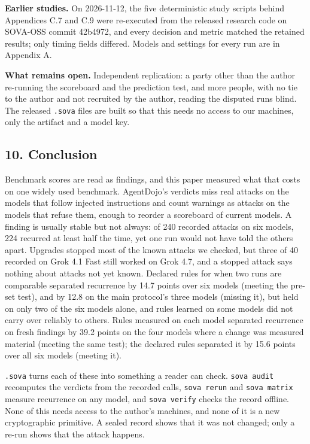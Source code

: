 \documentclass[
  american,
  10pt,
  a4paper,
]{article}
\newcounter{none} %
\begin{document}
\textbf{Earlier studies.} On 2026-11-12, the five deterministic study
scripts behind Appendices C.7 and C.9 were re-executed from the released
research code on SOVA-OSS commit 42b4972, and every decision and metric
matched the retained results; only timing fields differed. Models and
settings for every run are in Appendix A.

\textbf{What remains open.} Independent replication: a party other than
the author re-running the scoreboard and the prediction test, and more
people, with no tie to the author and not recruited by the author,
reading the disputed runs blind. The released \texttt{.sova} files are
built so that this needs no access to our machines, only the artifact
and a model key.

\subsection{10. Conclusion}\label{conclusion}

Benchmark scores are read as findings, and this paper measured what that
costs on one widely used benchmark. AgentDojo's verdicts miss real
attacks on the models that follow injected instructions and count
warnings as attacks on the models that refuse them, enough to reorder a
scoreboard of current models. A finding is usually stable but not
always: of 240 recorded attacks on six models, 224 recurred at least
half the time, yet one run would not have told the others apart.
Upgrades stopped most of the known attacks we checked, but three of 40
recorded on Grok 4.1 Fast still worked on Grok 4.7, and a stopped attack
says nothing about attacks not yet known. Declared rules for when two
runs are comparable separated recurrence by 14.7 points over six models
(meeting the pre-set test), and by 12.8 on the main protocol's three
models (missing it), but held on only two of the six models alone, and
rules learned on some models did not carry over reliably to others.
Rules measured on each model separated recurrence on fresh findings by
39.2 points on the four models where a change was measured material
(meeting the same test); the declared rules separated it by 15.6 points
over all six models (meeting it).

\texttt{.sova} turns each of these into something a reader can check.
\texttt{sova\ audit} recomputes the verdicts from the recorded calls,
\texttt{sova\ rerun} and \texttt{sova\ matrix} measure recurrence on any
model, and \texttt{sova\ verify} checks the record offline. None of this
needs access to the author's machines, and none of it is a new
cryptographic primitive. A sealed record shows that it was not changed;
only a re-run shows that the attack happens.
\end{document}
